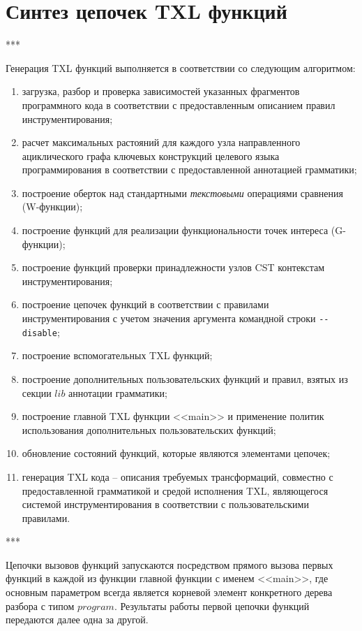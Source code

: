 \section{Синтез цепочек TXL функций}

***

Генерация TXL функций выполняется в соответствии со следующим алгоритмом:
\begin{enumerate}[noitemsep]
  \item загрузка, разбор и проверка зависимостей указанных фрагментов программного кода в соответствии с предоставленным описанием правил инструментирования;
  \item расчет максимальных растояний для каждого узла направленного ациклического графа ключевых конструкций целевого языка программирования в соответствии с предоставленной аннотацией грамматики;
  \item построение оберток над стандартными \textit{текстовыми} операциями сравнения (W-функции);
  \item построение функций для реализации функциональности точек интереса (G-функции);
  \item построение функций проверки принадлежности узлов CST контекстам инструментирования;
  \item построение цепочек функций в соответствии с правилами инструментирования с учетом значения аргумента командной строки \lstinline{--disable};
  \item построение вспомогательных TXL функций;
  \item построение дополнительных пользовательских функций и правил, взятых из секции $lib$ аннотации грамматики;
  \item построение главной TXL функции <<main>> и применение политик использования дополнительных пользовательских функций;
  \item обновление состояний функций, которые являются элементами цепочек;
  \item генерация TXL кода -- описания требуемых трансформаций, совместно с предоставленной грамматикой и средой исполнения TXL, являющегося системой инструментирования в соответствии с пользовательскими правилами.
\end{enumerate}

***

Цепочки вызовов функций запускаются посредством прямого вызова первых функций в каждой из функции главной функции с именем <<main>>, где  основным параметром всегда является корневой элемент конкретного дерева разбора с типом $program$.
Результаты работы первой цепочки функций передаются далее одна за другой.

